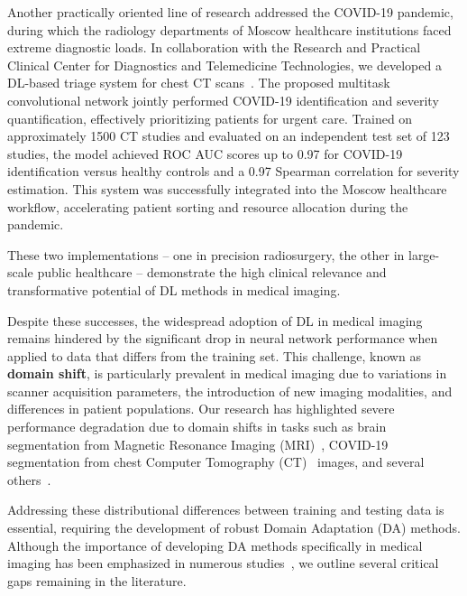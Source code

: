 Another practically oriented line of research addressed the COVID-19 pandemic, during which the radiology departments of Moscow healthcare institutions faced extreme diagnostic loads. In collaboration with the Research and Practical Clinical Center for Diagnostics and Telemedicine Technologies, we developed a DL-based triage system for chest CT scans~\cite{goncharov2021ct,covid-program}. The proposed multitask convolutional network jointly performed COVID-19 identification and severity quantification, effectively prioritizing patients for urgent care. Trained on approximately 1500 CT studies and evaluated on an independent test set of 123 studies, the model achieved ROC AUC scores up to 0.97 for COVID-19 identification versus healthy controls and a 0.97 Spearman correlation for severity estimation. This system was successfully integrated into the Moscow healthcare workflow, accelerating patient sorting and resource allocation during the pandemic.%

These two implementations -- one in precision radiosurgery, the other in large-scale public healthcare -- demonstrate the high clinical relevance and transformative potential of DL methods in medical imaging.

Despite these successes, the widespread adoption of DL in medical imaging remains hindered by the significant drop in neural network performance when applied to data that differs from the training set. This challenge, known as \textbf{domain shift}, is particularly prevalent in medical imaging due to variations in scanner acquisition parameters, the introduction of new imaging modalities, and differences in patient populations. Our research has highlighted severe performance degradation due to domain shifts in tasks such as brain segmentation from Magnetic Resonance Imaging (MRI)~\cite{shirokikh2020first,zakazov2021anatomy}, COVID-19 segmentation from chest Computer Tomography (CT)~\cite{saparov2021zero,shimovolos2022adaptation} images, and several others~\cite{vasiliuk2023limitations,shirokikh2025m3da}.

Addressing these distributional differences between training and testing data is essential, requiring the development of robust Domain Adaptation (DA) methods. Although the importance of developing DA methods specifically in medical imaging has been emphasized in numerous studies~\cite{gulrajani2020search,uda_survey_2020,zhuang2020comprehensive,peng2018visda,zhang2021empirical}, we outline several critical gaps remaining in the literature.

